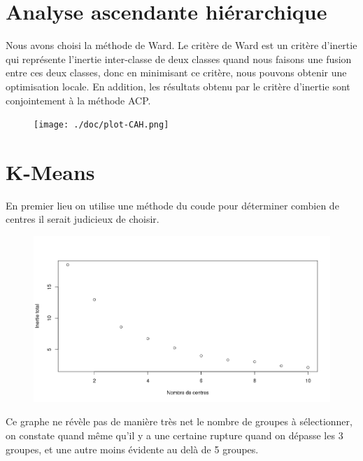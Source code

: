 \documentclass[a4paper, titlepage]{report}
\begin{document}
\section{Analyse ascendante hiérarchique}
Nous avons choisi la méthode de Ward. Le critère de Ward est un critère d'inertie qui représente l'inertie inter-classe de deux classes quand nous faisons une fusion entre ces deux classes, donc en minimisant ce critère, nous pouvons obtenir une optimisation locale. En addition, les résultats obtenu par le critère d'inertie sont conjointement à la méthode ACP.
\begin{figure}[h]
	\begin{center}
		\texttt{[image: ./doc/plot-CAH.png]}
	\end{center}
\end{figure}

\section{K-Means}

En premier lieu on utilise une méthode du coude pour déterminer combien de centres il serait judicieux de choisir.

\begin{figure}[h]
	\begin{center}
		\includegraphics[scale = 0.32]{./doc/plot-kmeans-mininertie.png}
	\end{center}
\end{figure}

Ce graphe ne révèle pas de manière très net le nombre de groupes à sélectionner, on constate quand même qu'il y a une certaine rupture quand on dépasse les 3 groupes, et une autre moins évidente au delà de 5 groupes. 
\end{document}
